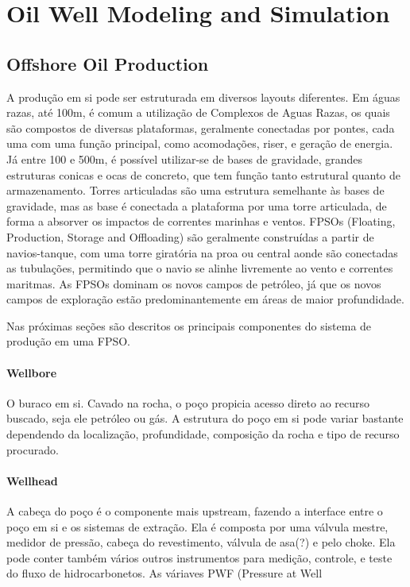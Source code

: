 

\chapter{Oil Well Modeling and Simulation} \label{chap:2}


\section{Offshore Oil Production}

A produção em si pode ser estruturada em diversos layouts diferentes. Em águas razas, até 100m, é comum a utilização de Complexos de Aguas Razas, os quais são compostos de diversas plataformas, geralmente conectadas por pontes, cada uma com uma função principal, como acomodações, riser, e geração de energia.
Já entre 100 e 500m, é possível utilizar-se de bases de gravidade, grandes estruturas conicas e ocas de concreto, que tem função tanto estrutural quanto de armazenamento. Torres articuladas são uma estrutura semelhante às bases de gravidade, mas as base é conectada a plataforma por uma torre articulada, de forma a absorver os impactos de correntes marinhas e ventos.
FPSOs (Floating, Production, Storage and Offloading) são geralmente construídas a partir de navios-tanque, com uma torre giratória na proa ou central aonde são conectadas as tubulações, permitindo que o navio se alinhe livremente ao vento e correntes maritmas. As FPSOs dominam os novos campos de petróleo, já que os novos campos de exploração estão predominantemente em áreas de maior profundidade.

Nas próximas seções são descritos os principais componentes do sistema de produção em uma FPSO.

\subsubsection{Wellbore}

O buraco em si. Cavado na rocha, o poço propicia acesso direto ao recurso buscado, seja ele petróleo ou gás. A estrutura do poço em si pode variar bastante dependendo da localização, profundidade, composição da rocha e tipo de recurso procurado.
 \\

\subsubsection{Wellhead}
A cabeça do poço é o componente mais upstream, fazendo a interface entre o poço em si e os sistemas de extração. Ela é composta por uma válvula mestre, medidor de pressão, cabeça do revestimento, válvula de asa(?) e pelo choke. Ela pode conter também vários outros instrumentos para medição, controle, e teste do fluxo de hidrocarbonetos.
As váriaves PWF (Pressure at Well 


